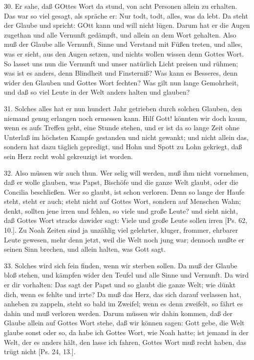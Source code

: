 30. Er sahe, daß GOttes Wort da stund, von acht Personen allein zu erhalten. Das war so viel gesagt, als spräche er: Nur todt, todt, alles, was da lebt. Da steht der Glaube und spricht: GOtt kann und will nicht lügen. Darum hat er die Augen zugethan und alle Vernunft gedämpft, und allein an dem Wort gehalten. Also muß der Glaube alle Vernunft, Sinne und Verstand mit Füßen treten, und alles, was er sieht, aus den Augen setzen, und nichts wollen wissen
denn Gottes Wort. So lasset uns nun die Vernunft und unser natürlich Licht preisen und rühmen; was ist es anders, denn Blindheit und Finsterniß? Was kann es Besseres, denn wider den Glauben und Gottes Wort fechten? Was gilt nun lange Gemohrheit, und daß so viel Leute in der Welt anders halten und glauben?

31. Solches alles hat er nun hundert Jahr getrieben durch solchen Glauben, den niemand genug erlangen noch ermessen kann. Hilf Gott! könnten wir doch kaum, wenn es aufs Treffen geht, eine Stunde stehen, und er ist da so lange Zeit ohne Unterlaß im höchsten Kampfe gestanden und nicht gewankt; und nicht allein das, sondern hat dazu täglich gepredigt, und Hohn und Spott zu Lohn gekriegt, daß sein Herz recht wohl gekreuzigt ist worden.

32. Also müssen wir auch thun. Wer selig will werden, muß ihm nicht vornehmen, daß er wolle glauben, was Papst, Bischöfe und die ganze Welt glaubt, oder die Concilia beschließen. Wer so glaubt, ist schon verloren. Denn so lange der Haufe steht, steht er auch; steht nicht auf Gottes Wort, sondern auf Menschen Wahn; denkt, sollten jene irren und fehlen, so viele und große Leute? und sieht nicht, daß Gottes Wort stracks dawider sagt: Viele und große Leute sollen irren [Ps. 62, 10.]. Zu Noah Zeiten sind ja unzählig viel gelehrter, kluger, frommer, ehrbarer Leute gewesen, mehr denn jetzt, weil die Welt noch jung war; dennoch mußte er seinen Sinn brechen, und allein halten, was Gott sagt.

33. Solches wird sich fein finden, wenn wir sterben sollen. Da muß der Glaube bloß stehen, und kämpfen wider den Teufel und alle Sinne und Vernunft. Da wird er dir vorhalten: Das sagt der Papst und so glaubt die ganze Welt; wie dünkt dich, wenn es fehlte und irrte? Da muß das Herz, das sich darauf verlassen hat, anheben zu zappeln, steht so bald im Zweifel; wenn es denn zweifelt, so fährt es dahin und muß verloren werden. Darum müssen wir dahin kommen, daß der Glaube allein auf Gottes Wort stehe, daß wir können sagen: Gott gebe, die Welt glaube sonst oder so, da habe ich Gottes Wort, wie Noah hatte; ist jemand in der Welt, der es anders hält, den lasse ich fahren, Gottes Wort muß recht haben, das trügt nicht [Ps. 24, 13.].

